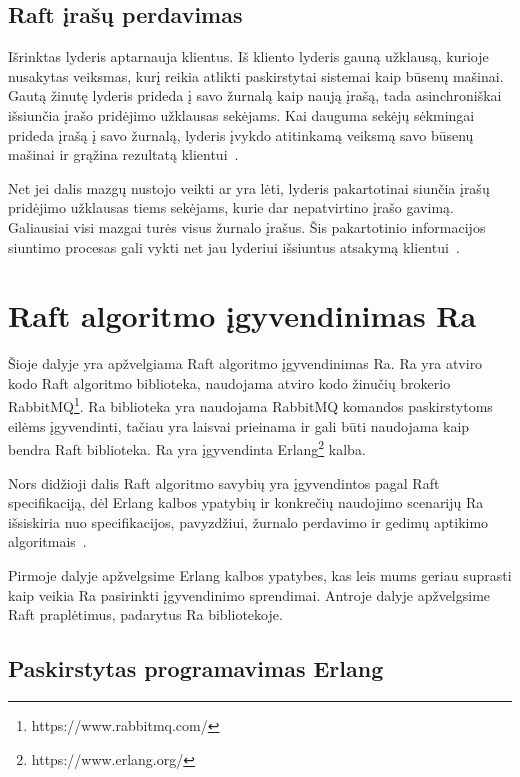 \documentclass{VUMIFPSkursinis}
\begin{document}
\subsection{Raft įrašų perdavimas}

Išrinktas lyderis aptarnauja klientus. Iš kliento lyderis gauną užklausą, kurioje nusakytas veiksmas, kurį reikia atlikti paskirstytai sistemai kaip būsenų mašinai. Gautą žinutę lyderis prideda į savo žurnalą kaip naują įrašą, tada asinchroniškai išsiunčia įrašo pridėjimo užklausas sekėjams. Kai dauguma sekėjų sėkmingai prideda įrašą į savo žurnalą, lyderis įvykdo atitinkamą veiksmą savo būsenų mašinai ir grąžina rezultatą klientui~\cite{ongaro_consensus}. 

Net jei dalis mazgų nustojo veikti ar yra lėti, lyderis pakartotinai siunčia įrašų pridėjimo užklausas tiems sekėjams, kurie dar nepatvirtino įrašo gavimą. Galiausiai visi mazgai turės visus žurnalo įrašus. Šis pakartotinio informacijos siuntimo procesas gali vykti net jau lyderiui išsiuntus atsakymą klientui~\cite{ongaro_consensus}.

\section{Raft algoritmo įgyvendinimas Ra}

Šioje dalyje yra apžvelgiama Raft algoritmo įgyvendinimas Ra. Ra yra atviro kodo Raft algoritmo biblioteka, naudojama atviro kodo žinučių brokerio RabbitMQ\footnote{https://www.rabbitmq.com/}. Ra biblioteka yra naudojama RabbitMQ komandos paskirstytoms eilėms įgyvendinti, tačiau yra laisvai prieinama ir gali būti naudojama kaip bendra Raft biblioteka. Ra yra įgyvendinta Erlang\footnote{https://www.erlang.org/} kalba.

Nors didžioji dalis Raft algoritmo savybių yra įgyvendintos pagal Raft specifikaciją, dėl Erlang kalbos ypatybių ir konkrečių naudojimo scenarijų Ra išsiskiria nuo specifikacijos, pavyzdžiui, žurnalo perdavimo ir gedimų aptikimo algoritmais~\cite{rabbitmqra}.

Pirmoje dalyje apžvelgsime Erlang kalbos ypatybes, kas leis mums geriau suprasti kaip veikia Ra pasirinkti įgyvendinimo sprendimai. Antroje dalyje apžvelgsime Raft praplėtimus, padarytus Ra bibliotekoje.

\subsection{Paskirstytas programavimas Erlang}
\end{document}
